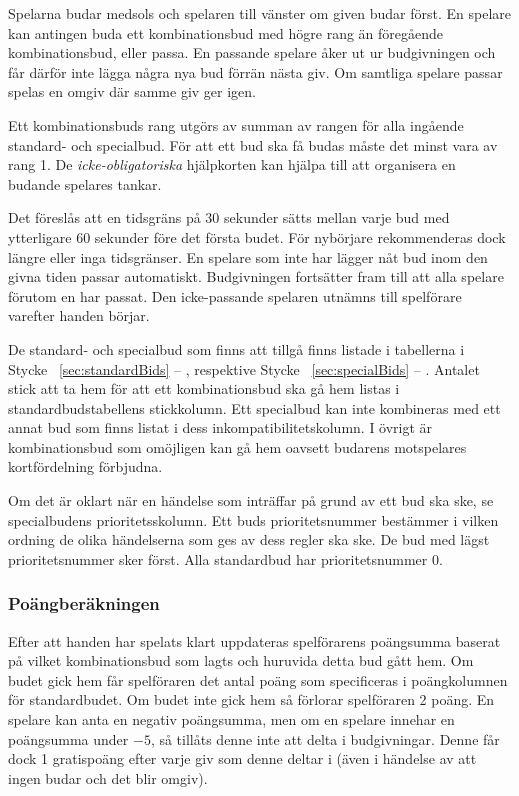 \documentclass[a4paper]{article} %
\renewcommand{\sectionref}[1]{%
	\ref{sec:#1} -- \nameref{sec:#1}%
}
\begin{document}
	Spelarna budar medsols och spelaren till vänster om given budar först. En spelare kan antingen buda ett kombinationsbud med högre rang än föregående kombinationsbud, eller passa. En passande spelare åker ut ur budgivningen och får därför inte lägga några nya bud förrän nästa giv. Om samtliga spelare passar spelas en omgiv där samme giv ger igen.

	Ett kombinationsbuds rang utgörs av summan av rangen för alla ingående standard- och specialbud. För att ett bud ska få budas måste det minst vara av rang 1. De \emph{icke-obligatoriska} hjälpkorten kan hjälpa till att organisera en budande spelares tankar.

	Det föreslås att en tidsgräns på 30 sekunder sätts mellan varje bud med ytterligare 60 sekunder före det första budet. För nybörjare rekommenderas dock längre eller inga tidsgränser. En spelare som inte har lägger nåt bud inom den givna tiden passar automatiskt. Budgivningen fortsätter fram till att alla spelare förutom en har passat. Den icke-passande spelaren utnämns till spelförare varefter handen börjar.

	De standard- och specialbud som finns att tillgå finns listade i tabellerna i Stycke~\sectionref{standardBids}, respektive Stycke~\sectionref{specialBids}. Antalet stick att ta hem för att ett kombinationsbud ska gå hem listas i standardbudstabellens stickkolumn. Ett specialbud kan inte kombineras med ett annat bud som finns listat i dess inkompatibilitetskolumn. I övrigt är kombinationsbud som omöjligen kan gå hem oavsett budarens motspelares kortfördelning förbjudna.

	Om det är oklart när en händelse som inträffar på grund av ett bud ska ske, se specialbudens prioritetsskolumn. Ett buds prioritetsnummer bestämmer i vilken ordning de olika händelserna som ges av dess regler ska ske. De bud med lägst prioritetsnummer sker först. Alla standardbud har prioritetsnummer 0.

	\subsubsection{Poängberäkningen}
	Efter att handen har spelats klart uppdateras spelförarens poängsumma baserat på vilket kombinationsbud som lagts och huruvida detta bud gått hem. Om budet gick hem får spelföraren det antal poäng som specificeras i poängkolumnen för standardbudet. Om budet inte gick hem så förlorar spelföraren 2 poäng. En spelare kan anta en negativ poängsumma, men om en spelare innehar en poängsumma under $-5$, så tillåts denne inte att delta i budgivningar. Denne får dock 1 gratispoäng efter varje giv som denne deltar i (även i händelse av att ingen budar och det blir omgiv).
\end{document}
